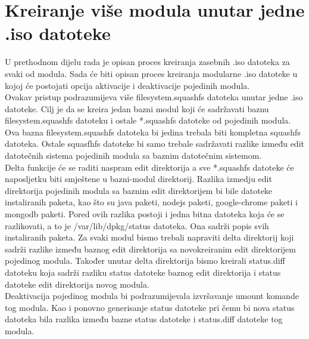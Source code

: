 \documentclass[12pt,vi]{mitthesis}
\begin{document}
\chapter*{Kreiranje više modula unutar jedne .iso datoteke}
\indent
U prethodnom dijelu rada je opisan proces kreiranja zasebnih .iso datoteka za svaki od modula. Sada će biti opisan proces kreiranja modularne .iso datoteke u kojoj će postojati opcija aktivacije i deaktivacije pojedinih modula.\\
Ovakav pristup podrazumijeva više filesystem.squashfs datoteka unutar jedne .iso datoteke. Cilj je da se kreira jedan bazni modul koji će sadržavati baznu filesystem.squashfs datoteku i ostale *.squashfs datoteke od pojedinih modula. Ova bazna filesystem.squashfs datoteka bi jedina trebala biti kompletna squashfs datoteka. Ostale squasfhfs datoteke bi samo trebale sadržavati razlike između edit datotečnih sistema pojedinih modula sa baznim datotečnim sistemom.\\
Delta funkcije će se raditi naspram edit direktorija a sve *.squashfs datoteke će naposljetku biti smještene u bazni-modul direktorij.
\indent
Razlika izmedju edit direktorija pojedinih modula sa baznim edit direktorijem bi bile datoteke instaliranih paketa, kao što su java paketi, nodejs paketi, google-chrome paketi i mongodb paketi. Pored ovih razlika postoji i jedna bitna datoteka koja će se razlikovati, a to je /var/lib/dpkg/status datoteka. Ona sadrži popis svih instaliranih paketa. Za svaki modul bismo trebali napraviti delta direktorij koji sadrži razlike između baznog edit direktorija sa novokreiranim  edit direktorijem pojedinog modula. Također unutar delta direktorija bismo kreirali status.diff datoteku koja sadrži razliku status datoteke baznog edit direktorija i status datoteke edit direktorija novog modula.\\
\indent
Deaktivacija pojedinog modula bi podrazumijevala izvršavanje umount komande tog modula. Kao i ponovno generisanje status datoteke pri čemu bi nova status datoteka bila razlika između bazne status datoteke i status.diff datoteke tog modula.
\end{document}
